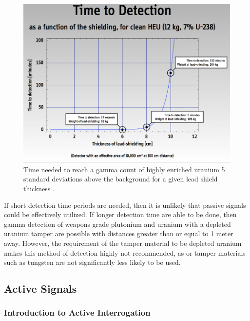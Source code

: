 \documentclass{report}
\newcommand{\myparagraph}[1]{\paragraph*{#1\\}}
\begin{document}
\begin{figure}
 \centering
 \includegraphics[trim = 0cm 0.1cm 0cm 0cm, clip,scale=0.4]{./figures/shield_time.png}
   \caption{Time needed to reach a gamma count of highly enriched uranium  5 standard deviations above the background for a given lead shield thickness \cite{Glaser2007}.}
     \label{fig:shield_time}
\end{figure}



If short detection time periods are needed, then it is unlikely that passive signals could be effectively utilized. If longer detection time are able to be done, then gamma detection of weapons grade plutonium and uranium with a depleted uranium tamper are possible with distances greater than or equal to 1 meter away. However, the requirement of the tamper material to be depleted uranium makes this method of detection highly not recommended, as or tamper materials such as tungsten are not significantly less likely to be used. 



\subsection{Active Signals}


\subsubsection{Introduction to Active Interrogation} \label{sec:intro_active_interrogation}
\end{document}
